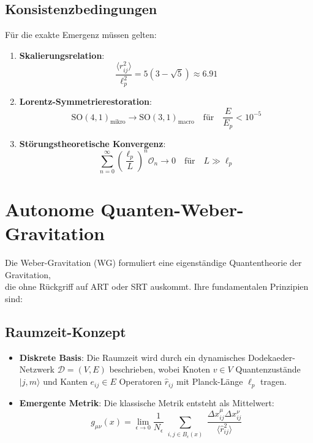 \subsection{Konsistenzbedingungen}
Für die exakte Emergenz müssen gelten:
\begin{enumerate}
\item \textbf{Skalierungsrelation}:
\begin{equation}
\frac{\langle r_{ij}^2 \rangle}{\ell_p^2} = 5(3-\sqrt{5}) \approx 6.91
\end{equation}

\item \textbf{Lorentz-Symmetrierestoration}:
\begin{equation}
\text{SO}(4,1)_{\text{mikro}} \to \text{SO}(3,1)_{\text{macro}} \quad \text{für} \quad \frac{E}{E_p} < 10^{-5}
\end{equation}

\item \textbf{Störungstheoretische Konvergenz}:
\begin{equation}
\sum_{n=0}^\infty \left( \frac{\ell_p}{L} \right)^n \mathcal{O}_n \to 0 \quad \text{für} \quad L \gg \ell_p
\end{equation}
\end{enumerate}

\section{Autonome Quanten-Weber-Gravitation}
Die Weber-Gravitation (WG) formuliert eine eigenständige Quantentheorie der Gravitation,\\die ohne Rückgriff auf ART oder SRT auskommt. Ihre fundamentalen Prinzipien sind:

\subsection{Raumzeit-Konzept}
\begin{itemize}
    \item \textbf{Diskrete Basis}: Die Raumzeit wird durch ein dynamisches Dodekaeder-Netzwerk $\mathcal{D}=(V,E)$ beschrieben, wobei Knoten $v\in V$ Quantenzustände $|j,m\rangle$ und Kanten $e_{ij}\in E$ Operatoren $\hat{r}_{ij}$ mit Planck-Länge $\ell_p$ tragen.
    
    \item \textbf{Emergente Metrik}: Die klassische Metrik entsteht als Mittelwert:
    \begin{equation}
        g_{\mu\nu}(x) = \lim_{\epsilon\to0} \frac{1}{N_\epsilon} \sum_{\substack{i,j\in B_\epsilon(x)}} \frac{\Delta x_{ij}^\mu \Delta x_{ij}^\nu}{\langle \hat{r}_{ij}^2 \rangle}
    \end{equation}
\end{itemize}

